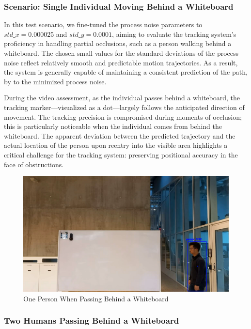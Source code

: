 \documentclass{article}
\begin{document}
\subsubsection{Scenario: Single Individual Moving Behind a Whiteboard}
In this test scenario, we fine-tuned the process noise parameters to \(std\_x = 0.000025\) and \(std\_y = 0.0001\), aiming to evaluate the tracking system's proficiency in handling partial occlusions, such as a person walking behind a whiteboard. The chosen small values for the standard deviations of the process noise reflect relatively smooth and predictable motion trajectories. As a result, the system is generally capable of maintaining a consistent prediction of the path, by to the minimized process noise.

During the video assessment, as the individual passes behind a whiteboard, the tracking marker—visualized as a dot—largely follows the anticipated direction of movement. The tracking precision is compromised during moments of occlusion; this is particularly noticeable when the individual comes from behind the whiteboard. The apparent deviation between the predicted trajectory and the actual location of the person upon reentry into the visible area highlights a critical challenge for the tracking system: preserving positional accuracy in the face of obstructions.

\begin{figure}[H]
\centering
\includegraphics[width=0.5\linewidth]{one people.png}
\caption{One Person When Passing Behind a Whiteboard}
\label{fig:one human}
\end{figure}

\subsubsection{Two Humans Passing Behind a Whiteboard}
\end{document}
